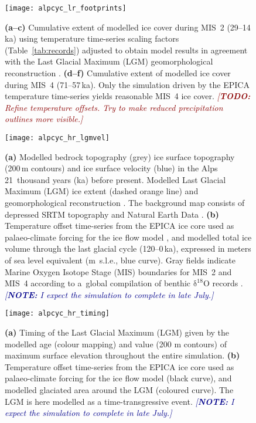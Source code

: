 \documentclass{article}
\newcommand{\note}[1]{\textcolor{darkblue}{\emph{[\textbf{NOTE:} #1]}}}
\newcommand{\todo}[1]{\textcolor{darkred}{\emph{[\textbf{TODO:} #1]}}}
\newcommand{\chem}[1]{\ensuremath{\mathrm{#1}}}
\begin{document}
    \begin{figure}
      \centerline{\texttt{[image: alpcyc\_lr\_footprints]}}
      \caption{%
        \textbf{(a--c)} Cumulative extent of modelled ice cover during MIS~2
        (29--14\,ka) using temperature time-series scaling factors
        (Table~\ref{tab:records}) adjusted to obtain model results in agreement
        with the Last Glacial Maximum (LGM) geomorphological reconstruction
        \citep[solid red line,][]{Ehlers.etal.2011}.
        \textbf{(d--f)} Cumulative extent of modelled ice cover during MIS~4
        (71--57\,ka). Only the simulation driven by the EPICA temperature
        time-series yields reasonable MIS~4 ice cover.
        \todo{Refine temperature offsets. Try to make reduced precipitation
              outlines more visible.}}
      \label{fig:footprints}
    \end{figure}

    \begin{figure}
      \centerline{\texttt{[image: alpcyc\_hr\_lgmvel]}}
      \caption{%
        \textbf{(a)} Modelled bedrock topography (grey) ice surface topography
        (200\,m contours) and ice surface velocity (blue) in the Alps
        21~thousand years (ka) before present. Modelled Last Glacial Maximum
        (LGM) ice extent (dashed orange line) and geomorphological
        reconstruction \citep[solid red line,][]{Ehlers.etal.2011}. The
        background map consists of depressed SRTM \citep{Jarvis.etal.2008}
        topography and Natural Earth Data \citep{Patterson.Kelso.2015}.
        \textbf{(b)} Temperature offset time-series from the EPICA ice core
        used as palaeo-climate forcing for the ice flow model \citep[black
        curve,][]{Jouzel.etal.2007}, and modelled total ice volume through the
        last glacial cycle (120--0\,ka), expressed in meters of sea level
        equivalent (m~s.l.e., blue curve). Gray fields indicate Marine
        Oxygen Isotope Stage (MIS) boundaries for MIS~2 and MIS~4 according to
        a~global compilation of benthic \chem{\delta^{18}O} records
        \citep{Lisiecki.Raymo.2005}.
        \note{I expect the simulation to complete in late July.}}
      \label{fig:lgmvel}
    \end{figure}

    \begin{figure}
      \centerline{\texttt{[image: alpcyc\_hr\_timing]}}
      \caption{%
        \textbf{(a)} Timing of the Last Glacial Maximum (LGM) given by the
        modelled age (colour mapping) and value (200 m contours) of maximum
        surface elevation throughout the entire simulation.
        \textbf{(b)} Temperature offset time-series from the EPICA ice core
        used as palaeo-climate forcing for the ice flow model (black curve),
        and modelled glaciated area around the LGM (coloured curve). The LGM
        is here modelled as a time-transgressive event.
        \note{I expect the simulation to complete in late July.}}
      \label{fig:timing}
    \end{figure}
\end{document}

